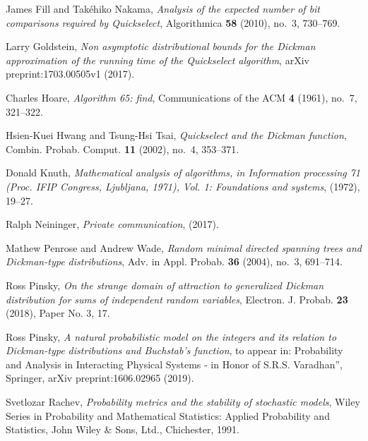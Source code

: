 \documentclass[12pt]{article}
\begin{document}
\begin{thebibliography}{10}
	James Fill and Tak\'{e}hiko Nakama, \emph{Analysis of the expected number
		of bit comparisons required by {Q}uickselect}, Algorithmica \textbf{58}
	(2010), no.~3, 730--769. %
	
	Larry Goldstein, \emph{Non asymptotic distributional bounds for the {D}ickman
		approximation of the running time of the {Q}uickselect algorithm}, arXiv
	preprint:1703.00505v1 (2017).
	
	Charles Hoare, \emph{Algorithm 65: find}, Communications of the ACM
	\textbf{4} (1961), no.~7, 321--322.
	
	Hsien-Kuei Hwang and Tsung-Hsi Tsai, \emph{Quickselect and the {D}ickman
		function}, Combin. Probab. Comput. \textbf{11} (2002), no.~4, 353--371.
	
	Donald Knuth, \emph{Mathematical analysis of algorithms, in {I}nformation
		processing 71 ({P}roc. {IFIP} {C}ongress, {L}jubljana, 1971), {V}ol. 1:
		{F}oundations and systems},  (1972), 19--27. %
	
	Ralph Neininger, \emph{Private communication},  (2017).
	
	Mathew Penrose and Andrew Wade, \emph{Random minimal directed spanning
		trees and {D}ickman-type distributions}, Adv. in Appl. Probab. \textbf{36}
	(2004), no.~3, 691--714. %
	
	Ross Pinsky, \emph{On the strange domain of attraction to generalized
		{D}ickman distribution for sums of independent random variables}, Electron.
	J. Probab. \textbf{23} (2018), Paper No. 3, 17. %
	
	Ross Pinsky, \emph{A natural probabilistic model on the integers and its
		relation to {D}ickman-type distributions and {B}uchstab's function}, to
	appear in: Probability and Analysis in Interacting Physical Systems - in
	Honor of S.R.S. Varadhan'', Springer, arXiv preprint:1606.02965 (2019).
	
	Svetlozar Rachev, \emph{Probability metrics and the stability of stochastic
		models}, Wiley Series in Probability and Mathematical Statistics: Applied
	Probability and Statistics, John Wiley \& Sons, Ltd., Chichester, 1991.
	
\end{thebibliography}
\end{document}
